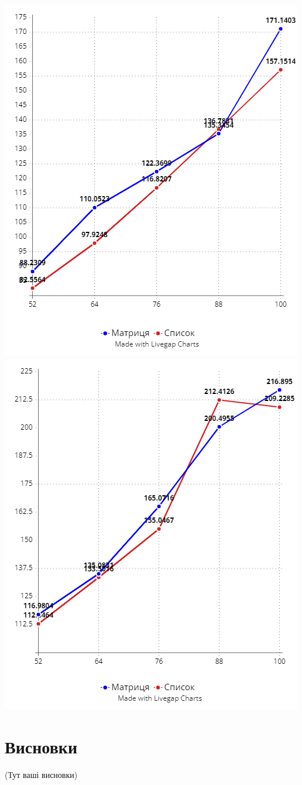 \documentclass[12pt, letterpaper, twoside]{article}
\begin{document}
\includegraphics[width=0.5\linewidth]{164-182.png}
\includegraphics[width=0.5\linewidth]{182-200.png}



\section{Висновки}

(Тут ваші висновки)
\end{document}
